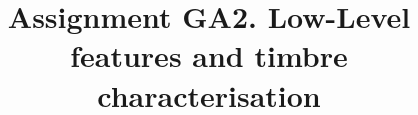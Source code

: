 \documentclass[8pt]{IEEEtran}
\begin{document}
\title{Assignment GA2. Low-Level features and timbre characterisation}
\author{
\and
{}
}

\maketitle














\printbibliography[]
\end{document}
